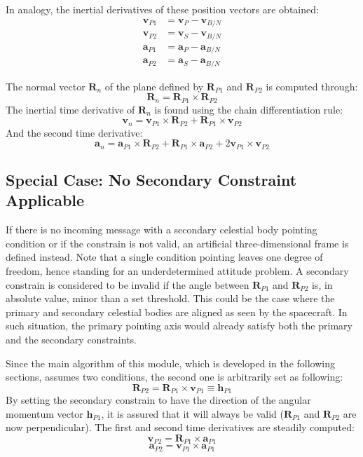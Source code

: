 \documentclass[]{AVSSimReportMemo}
\begin{document}
In analogy, the inertial derivatives of these position vectors are obtained:
\begin{subequations}
	\begin{align}
		 \bm{v}_{P1} &=\bm{v}_{P} - \bm{v}_{B/N} \\
		 \bm{v}_{P2} &=\bm{v}_{S} - \bm{v}_{B/N} \\
		 \bm{a}_{P1} &=\bm{a}_{P} - \bm{a}_{B/N} \\
		 \bm{a}_{P2} &=\bm{a}_{S} - \bm{a}_{B/N}
	\end{align}
\end{subequations}

The normal vector $\bm{R}_{n}$ of the plane defined by $\bm{R}_{P1}$ and $\bm{R}_{P2}$ is computed through:
\begin{equation}
	\bm R_{n} =\bm{R}_{P1} \times \bm{R}_{P2}
\end{equation}
The inertial time derivative of $\bm{R}_n$ is found using the chain differentiation rule:
\begin{equation}
	\bm {v}_{n} = \bm{v}_{P1} \times \bm{R}_{P2} + \bm{R}_{P1} \times \bm{v}_{P2}
\end{equation}
And the second time derivative:
\begin{equation}
	\bm {a}_{n} = \bm{a}_{P1} \times \bm{R}_{P2} + \bm{R}_{P1} \times \bm{a}_{P2}  + 2 \bm{v}_{P1} \times \bm{v}_{P2}
\end{equation}
\subsection{ Special Case: No Secondary Constraint Applicable}
If there is no incoming message with a secondary celestial body pointing condition or if the constrain is not valid, an artificial three-dimensional frame is defined instead. Note that a single condition pointing leaves one degree of freedom, hence standing for an underdetermined attitude problem. A secondary constrain is considered to be invalid if the angle between $\bm{R}_{P1}$ and $\bm{R}_{P2}$ is, in absolute value, minor than a set threshold. This could be the case where the primary and secondary celestial bodies are aligned as seen by the spacecraft. In such situation, the primary pointing axis would already satisfy both the primary and the secondary constraints.

Since the main algorithm of this module, which is developed in the following sections, assumes two conditions, the second one is arbitrarily set as following:
\begin{equation}
		 \bm{R}_{P2} = \bm{R}_{P1} \times \bm{v}_{P1} \equiv  \bm{h}_{P1}
\end{equation}
By setting the secondary constrain to have the direction of the angular momentum vector $ \bm{h}_{P1}$, it is assured that it will always be valid ($\bm{R}_{P1}$ and $\bm{R}_{P2}$ are now perpendicular).
The first and second time derivatives are steadily computed:
\begin{equation}
	\bm{v}_{P2} =  \bm{R}_{P1} \times \bm{a}_{P1}
\end{equation}
\begin{equation}
	\bm{a}_{P2} =  \bm{v}_{P1} \times \bm{a}_{P1}
\end{equation}
\end{document}
